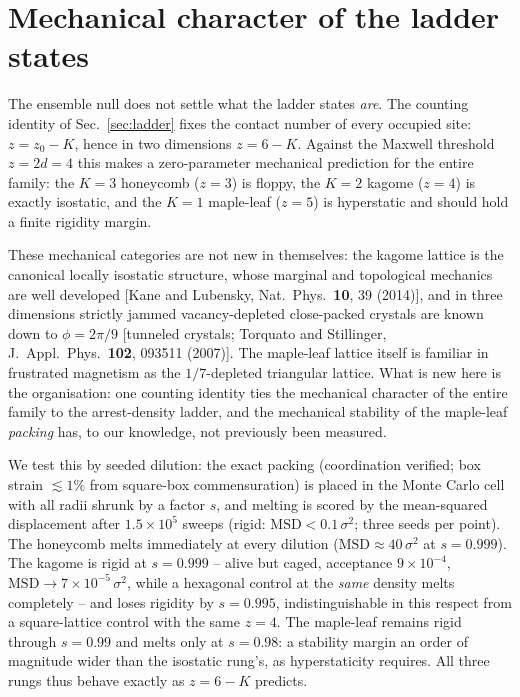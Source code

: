 \documentclass[11pt]{article}
\begin{document}
\section{Mechanical character of the ladder states}
\label{sec:mech}

The ensemble null does not settle what the ladder states \emph{are}. The
counting identity of Sec.~\ref{sec:ladder} fixes the contact number of
every occupied site: $z=z_0-K$, hence in two dimensions $z=6-K$. Against
the Maxwell threshold $z=2d=4$ this makes a zero-parameter mechanical
prediction for the entire family: the $K{=}3$ honeycomb ($z{=}3$) is
floppy, the $K{=}2$ kagome ($z{=}4$) is exactly isostatic, and the $K{=}1$
maple-leaf ($z{=}5$) is hyperstatic and should hold a finite rigidity
margin.

These mechanical categories are not new in themselves: the kagome lattice
is the canonical locally isostatic structure, whose marginal and topological
mechanics are well developed [Kane and Lubensky, Nat.\ Phys.\ \textbf{10},
39 (2014)], and in three dimensions strictly jammed vacancy-depleted
close-packed crystals are known down to $\phi=2\pi/9$ [tunneled crystals;
Torquato and Stillinger, J.\ Appl.\ Phys.\ \textbf{102}, 093511 (2007)].
The maple-leaf lattice itself is familiar in frustrated magnetism as the
$1/7$-depleted triangular lattice. What is new here is the organisation:
one counting identity ties the mechanical character of the entire family to
the arrest-density ladder, and the mechanical stability of the maple-leaf
\emph{packing} has, to our knowledge, not previously been measured.

We test this by seeded dilution: the exact packing (coordination verified;
box strain $\lesssim1\%$ from square-box commensuration) is placed in the
Monte Carlo cell with all radii shrunk by a factor $s$, and melting is
scored by the mean-squared displacement after $1.5\times10^5$ sweeps
(rigid: $\mathrm{MSD}<0.1\,\sigma^2$; three seeds per point). The
honeycomb melts immediately at every dilution
($\mathrm{MSD}\approx40\,\sigma^2$ at $s=0.999$). The kagome is rigid at
$s=0.999$ -- alive but caged, acceptance $9\times10^{-4}$,
$\mathrm{MSD}\to7\times10^{-5}\,\sigma^2$, while a hexagonal control at
the \emph{same} density melts completely -- and loses rigidity by
$s=0.995$, indistinguishable in this respect from a square-lattice control
with the same $z=4$. The maple-leaf remains rigid through $s=0.99$ and
melts only at $s=0.98$: a stability margin an order of magnitude wider
than the isostatic rung's, as hyperstaticity requires. All three rungs
thus behave exactly as $z=6-K$ predicts.
\end{document}
